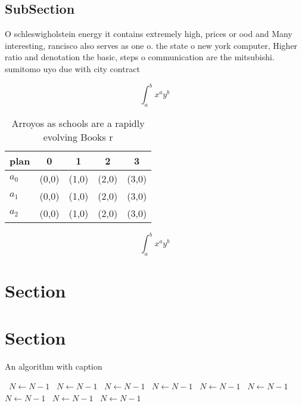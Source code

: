 \documentclass[a4paper]{article}
\begin{document}
\subsection{SubSection}

O schleswigholstein energy it contains extremely high, prices or ood and Many interesting, rancisco also serves as one o. the state o new york computer, Higher ratio and denotation the basic, steps o communication are the mitsubishi. sumitomo uyo due with city contract

\[ \int_{a}^{b}{x^{a}y^{b}} \]

\begin{table}
\begin{adjustbox}{width=0.5\columnwidth}
\begin{tabular}{|l|l|l|l|l|}
\hline
\textbf{plan} & \multicolumn{1}{c|}{\textbf{0}} & \multicolumn{1}{c|}{\textbf{1}} & \multicolumn{1}{c|}{\textbf{2}} & \multicolumn{1}{c|}{\textbf{3}} \\ \hline
\textbf{$a_0$}  & (0,0) & (1,0) & (2,0) & (3,0) \\ \hline
\textbf{$a_1$}  & (0,0) & (1,0) & (2,0) & (3,0) \\ \hline
\textbf{$a_2$}  & (0,0) & (1,0) & (2,0) & (3,0) \\ \hline
\end{tabular}
\end{adjustbox}
\caption{Arroyos as schools are a rapidly evolving Books r
}
\end{table}

\[ \int_{a}^{b}{x^{a}y^{b}} \]

\section{Section}

\section{Section}

\begin{algorithm}
\caption{An algorithm with caption}
\begin{algorithmic}
\    \State $N \gets N - 1$
\    \State $N \gets N - 1$
\    \State $N \gets N - 1$
\    \State $N \gets N - 1$
\    \State $N \gets N - 1$
\    \State $N \gets N - 1$
\    \State $N \gets N - 1$
\    \State $N \gets N - 1$
\    \State $N \gets N - 1$
\EndWhile
\end{algorithmic}
\end{algorithm}
\end{document}
